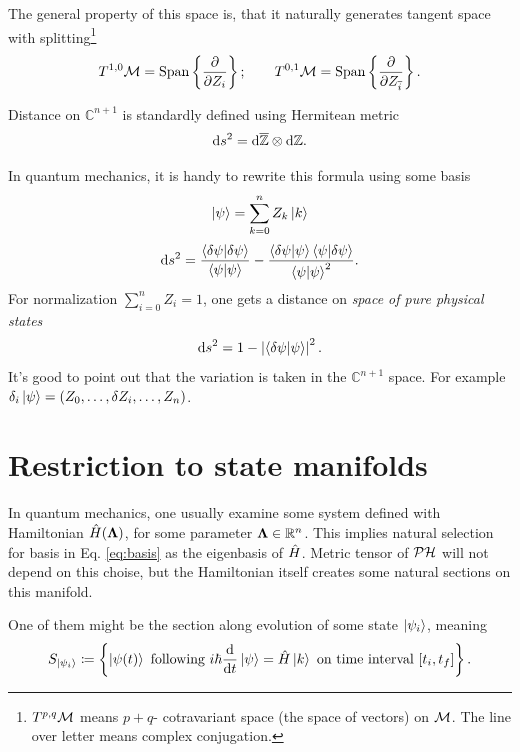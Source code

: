 The general property of this space is, that it naturally generates tangent space with splitting\footnote{$T^{p,q}\mathcal{M}$ means $p+q$- cotravariant space (the space of vectors) on $\mathcal{M}$. The line over letter means complex conjugation.}
$$T^{1,0}\mathcal{M}=\text{Span}\left\{\frac{\partial}{\partial Z_i}\right\}; \qquad T^{0,1}\mathcal{M}=\text{Span}\left\{\frac{\partial}{\partial Z_{\overline{i}}}\right\}.$$


Distance on $\mathbb{C}^{n+1}$ is standardly defined using Hermitean metric
\begin{equation}
    \mathrm{d} s^2 = \mathrm{d} \overline{\mathbb{Z}} \otimes \mathrm{d} \mathbb{Z}.
\label{eq:metricdistancePH}
\end{equation}

In quantum mechanics, it is handy to rewrite this formula using some basis
\begin{equation}
    \ket{\psi}=\sum_{k=0}^n Z_k \ket{k}
    \label{eq:basis}
\end{equation} 
\begin{equation}
    \mathrm{d} s^2 = \frac{\braket{\delta \psi|\delta\psi}}{\braket{\psi|\psi}}-\frac{\braket{\delta \psi|\psi}\braket{\psi|\delta \psi}}{\braket{\psi|\psi}^2}.
\end{equation}
For normalization $\sum_{i=0}^n Z_i=1$, one gets a distance on \emph{space of pure physical states}
\begin{equation}
    \mathrm{d} s^2 = 1-\left|\braket{\delta \psi|\psi}\right|^2.
    \label{eq:distanceInPH}
\end{equation}
It's good to point out that the variation is taken in the $\mathbb{C}^{n+1}$ space. For example $\delta_i \ket{\psi} = (Z_0,\dots, \delta Z_i,\dots,Z_n)$. 




\section{Restriction to state manifolds}
In quantum mechanics, one usually examine some system defined with Hamiltonian $\hat{H}({\bm\Lambda})$, for some parameter ${\bm\Lambda}\in \mathbb{R}^n$. This implies natural selection for basis in Eq. \ref{eq:basis} as the eigenbasis of $\hat{H}$. Metric tensor of $\mathcal{PH}$ will not depend on this choise, but the Hamiltonian itself creates some natural sections on this manifold. 

One of them might be the section along \Schrodinger evolution of some state $\ket{\psi_i}$, meaning
$$
    S_{\ket{\psi_i}}\coloneqq \left\{ \ket{\psi(t)} \text{ following } i\hbar \frac{\mathrm{d}}{\mathrm{d} t}\ket{\psi}=\hat{H}\ket{k}  \text{ on time interval }[t_i, t_f]\right\}.
$$

